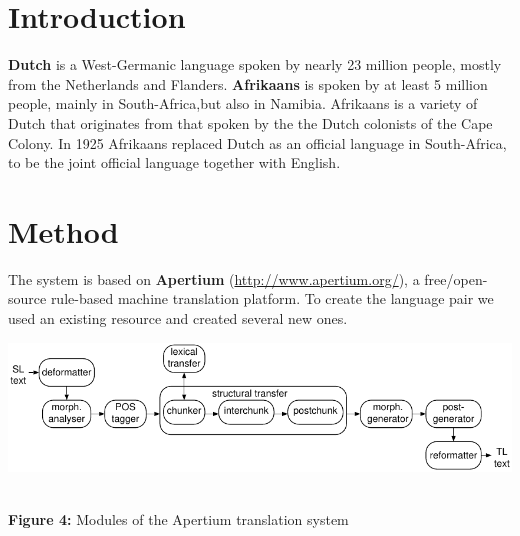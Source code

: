 \documentclass[a0,landscape]{a0poster}
\begin{document}
\begin{multicols}{4}

\newlength{\figwidth}
\setlength{\figwidth}{20cm}

\newlength{\fighalfwidth}
\setlength{\fighalfwidth}{10cm}


\section{Introduction}

\noindent
{\bf Dutch} is a West-Germanic language spoken by nearly 23 million people, mostly from the 
Netherlands and Flanders. {\bf Afrikaans} is spoken by at least 5 million people, mainly in 
South-Africa,but also in Namibia. Afrikaans is a variety of Dutch that originates from that 
spoken by the the Dutch colonists of the Cape Colony. In 1925 Afrikaans replaced Dutch as
an official language in South-Africa, to be the joint official language together with English.

\vspace{1.5cm}

\section{Method}

\noindent
The system is based on {\bf Apertium} (\url{http://www.apertium.org/}), a free/open-source rule-based
machine translation platform. To create the language pair we used an existing resource and created 
several new ones. \\

\begin{center}
\begin{minipage}[b]{26cm}
\includegraphics[width=260mm]{apertium2.pdf}
\end{minipage}\\
\textbf{Figure 4:} Modules of the Apertium translation system
\vspace{0.3cm}
\end{center}



\end{multicols}
\end{document}
